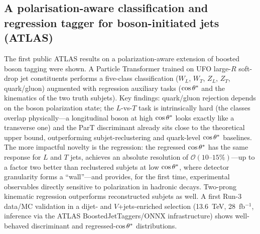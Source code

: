 \subsection{A polarisation-aware classification and regression tagger for boson-initiated jets (ATLAS)}
The first public ATLAS results on a polarization-aware extension of boosted
boson tagging were shown. A Particle Transformer trained on UFO large-$R$
soft-drop jet constituents performs a five-class classification ($W_L$, $W_T$,
$Z_L$, $Z_T$, quark/gluon) augmented with regression auxiliary tasks
($\cos\theta^{*}$ and the kinematics of the two truth subjets). Key findings:
quark/gluon rejection depends on the boson polarization state; the $L$-vs-$T$
task is intrinsically hard (the classes overlap physically---a longitudinal
boson at high $\cos\theta^{*}$ looks exactly like a transverse one) and the ParT
discriminant already sits close to the theoretical upper bound, outperforming
subjet-reclustering and quark-level $\cos\theta^{*}$ baselines. The more impactful
novelty is the regression: the regressed $\cos\theta^{*}$ has the same response for
$L$ and $T$ jets, achieves an absolute resolution of
$\mathcal{O}(10\text{--}15\%)$---up to a factor two better than reclustered
subjets at low $\cos\theta^{*}$, where detector granularity forms a ``wall''---and
provides, for the first time, experimental observables directly sensitive to
polarization in hadronic decays. Two-prong kinematic regression outperforms
reconstructed subjets as well. A first Run-3 data/MC validation in a dijet-
and $V$+jets-enriched selection (13.6~TeV, 28~fb$^{-1}$, inference via the
ATLAS BoostedJetTaggers/ONNX infrastructure) shows well-behaved discriminant
and regressed-$\cos\theta^{*}$ distributions.

